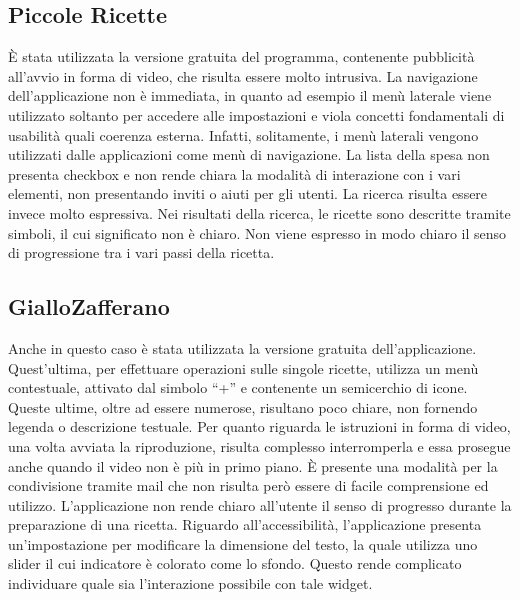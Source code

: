 \subsection{Piccole Ricette}
È stata utilizzata la versione gratuita del programma, contenente pubblicità
all'avvio in forma di video, che risulta essere molto intrusiva.  La navigazione
dell'applicazione non è immediata, in quanto ad esempio il menù laterale viene
utilizzato soltanto per accedere alle impostazioni e viola concetti fondamentali
di usabilità quali coerenza esterna. Infatti, solitamente,
i menù laterali vengono utilizzati dalle applicazioni come menù di navigazione.
La lista della spesa non presenta checkbox e non rende chiara la modalità di interazione 
con i vari elementi, non presentando inviti o aiuti per gli utenti. La ricerca
risulta essere invece molto espressiva. Nei risultati della ricerca, le
ricette sono descritte tramite simboli, il cui significato non è chiaro.
Non viene espresso in modo chiaro il senso di progressione tra i vari passi della ricetta.

\subsection{GialloZafferano}
Anche in questo caso è stata utilizzata la versione gratuita dell'applicazione.
Quest'ultima, per effettuare operazioni sulle singole ricette, utilizza un menù
contestuale, attivato dal simbolo ``+'' e contenente un semicerchio di icone.
Queste ultime, oltre ad essere numerose, risultano poco chiare, non fornendo legenda o descrizione
testuale.  Per quanto riguarda le
istruzioni in forma di video, una volta avviata la riproduzione, risulta complesso interromperla e essa prosegue
anche quando il video non è più in primo piano.
È presente una modalità per la condivisione tramite mail che non
risulta però essere di facile comprensione ed utilizzo.  L'applicazione non rende chiaro
all'utente il senso di progresso durante la preparazione di una ricetta.
Riguardo all'accessibilità, l'applicazione presenta un'impostazione per
modificare la dimensione del testo, la quale utilizza uno slider il cui
indicatore è colorato come lo sfondo.
Questo rende complicato individuare quale sia l'interazione possibile con tale widget.

